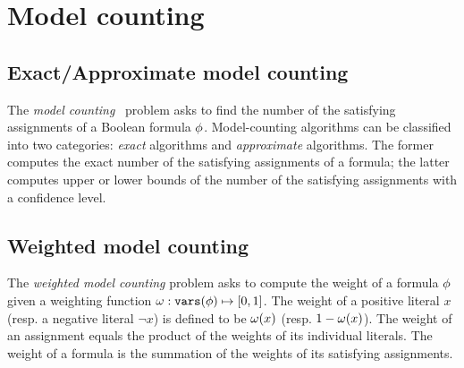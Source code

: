 \section{Model counting}
\label{sect:model-counting}

\subsection{Exact/Approximate model counting}
The \textit{model counting}~\cite{SATHandbook-ModelCounting} problem asks to find the number of the satisfying assignments of a Boolean formula $\phi$.
Model-counting algorithms can be classified into two categories:
\textit{exact} algorithms and \textit{approximate} algorithms.
The former computes the exact number of the satisfying assignments of a formula;
the latter computes upper or lower bounds of the number of the satisfying assignments with a confidence level.

\subsection{Weighted model counting}
The \textit{weighted model counting} problem asks to compute the weight of a formula $\phi$ given a weighting function $\omega:\mathtt{vars}(\phi)\mapsto[0,1]$.
The weight of a positive literal $x$ (resp. a negative literal $\lnot x$) is defined to be $\omega(x)$ (resp. $1-\omega(x)$).
The weight of an assignment equals the product of the weights of its individual literals.
The weight of a formula is the summation of the weights of its satisfying assignments.